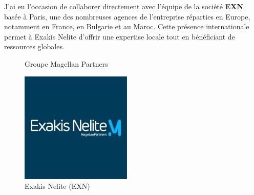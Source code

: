 J'ai eu l'occasion de collaborer directement avec l'équipe de la société \textbf{EXN} basée à Paris, une des nombreuses agences de l'entreprise réparties en Europe, notamment en France, en Bulgarie et au Maroc. Cette présence internationale permet à Exakis Nelite d'offrir une expertise locale tout en bénéficiant de ressources globales.

\begin{figure}[H]
    \centering
    \begin{minipage}{0.49\textwidth}
        \centering
        \caption{Groupe Magellan Partners}
    \end{minipage}
    \hfill
    \begin{minipage}{0.49\textwidth}
        \centering
        \includegraphics[scale=0.6]{images/EXNlogo.jpeg}
        \caption{Exakis Nelite (EXN)}
    \end{minipage}
\end{figure}


